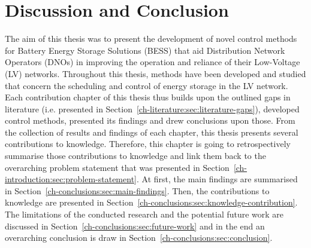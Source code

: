 \chapter{Discussion and Conclusion}
\label{ch-conclusions}

The aim of this thesis was to present the development of novel control methods for Battery Energy Storage Solutions (BESS) that aid Distribution Network Operators (DNOs) in improving the operation and reliance of their Low-Voltage (LV) networks.
Throughout this thesis, methods have been developed and studied that concern the scheduling and control of energy storage in the LV network.
Each contribution chapter of this thesis thus builds upon the outlined gaps in literature (i.e. presented in Section~\ref{ch-literature:sec:literature-gaps}), developed control methods, presented its findings and drew conclusions upon those.
From the collection of results and findings of each chapter, this thesis presents several contributions to knowledge.
Therefore, this chapter is going to retrospectively summarise those contributions to knowledge and link them back to the overarching problem statement that was presented in Section~\ref{ch-introduction:sec:problem-statement}.
At first, the main findings are summarised in Section~\ref{ch-conclusions:sec:main-findings}.
Then, the contributions to knowledge are presented in Section~\ref{ch-conclusions:sec:knowledge-contribution}.
The limitations of the conducted research and the potential future work are discussed in Section~\ref{ch-conclusions:sec:future-work} and in the end an overarching conclusion is draw in Section~\ref{ch-conclusions:sec:conclusion}.











